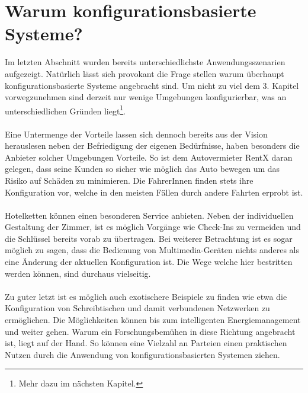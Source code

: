 \section{Warum konfigurationsbasierte Systeme?}
Im letzten Abschnitt wurden bereits unterschiedlichste Anwendungsszenarien aufgezeigt. Natürlich lässt sich provokant die Frage stellen warum überhaupt konfigurationsbasierte
Systeme angebracht sind. Um nicht zu viel dem 3. Kapitel vorwegzunehmen sind derzeit nur wenige Umgebungen konfigurierbar, was an unterschiedlichen Gründen 
liegt\footnote{Mehr dazu im nächsten Kapitel.}.
\\\\
Eine Untermenge der Vorteile lassen sich dennoch bereits aus der Vision herauslesen neben der Befriedigung der eigenen Bedürfnisse, haben besonders die Anbieter solcher 
Umgebungen Vorteile. So ist dem Autovermieter RentX daran gelegen, dass seine Kunden so sicher wie möglich das Auto bewegen um das Risiko auf Schäden zu minimieren. Die 
FahrerInnen finden stets ihre Konfiguration vor, welche in den meisten Fällen durch andere Fahrten erprobt ist.
\\\\
Hotelketten können einen besonderen Service anbieten. Neben der individuellen Gestaltung der Zimmer, ist es möglich Vorgänge wie Check-Ins zu vermeiden und die Schlüssel 
bereits vorab zu übertragen. Bei weiterer Betrachtung ist es sogar möglich zu sagen, dass die Bedienung von Multimedia-Geräten nichts anderes als eine Änderung der aktuellen
Konfiguration ist. Die Wege welche hier bestritten werden können, sind durchaus vielseitig. 
\\\\
Zu guter letzt ist es möglich auch exotischere Beispiele zu finden wie etwa die Konfiguration von Schreibtischen und damit verbundenen Netzwerken zu ermöglichen. 
Die Möglichkeiten können bis zum intelligenten Energiemanagement und weiter gehen.
Warum ein Forschungsbemühen in diese Richtung angebracht ist, liegt auf der Hand. So können eine Vielzahl an Parteien einen praktischen Nutzen durch die Anwendung von 
konfigurationsbasierten Systemen ziehen.

